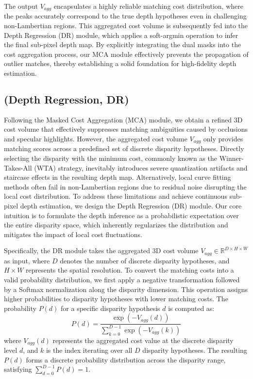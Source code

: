 \documentclass[lettersize,journal]{IEEEtran}
\begin{document}
The output $V_{agg}$ encapsulates a highly reliable matching cost distribution, where the peaks accurately correspond to the true depth hypotheses even in challenging non-Lambertian regions. This aggregated cost volume is subsequently fed into the Depth Regression (DR) module, which applies a soft-argmin operation to infer the final sub-pixel depth map. By explicitly integrating the dual masks into the cost aggregation process, our MCA module effectively prevents the propagation of outlier matches, thereby establishing a solid foundation for high-fidelity depth estimation.

\subsection{(Depth Regression, DR)}

Following the Masked Cost Aggregation (MCA) module, we obtain a refined 3D cost volume that effectively suppresses matching ambiguities caused by occlusions and specular highlights. However, the aggregated cost volume $V_{agg}$ only provides matching scores across a predefined set of discrete disparity hypotheses. Directly selecting the disparity with the minimum cost, commonly known as the Winner-Takes-All (WTA) strategy, inevitably introduces severe quantization artifacts and staircase effects in the resulting depth map. Alternatively, local curve fitting methods often fail in non-Lambertian regions due to residual noise disrupting the local cost distribution. To address these limitations and achieve continuous sub-pixel depth estimation, we design the Depth Regression (DR) module. Our core intuition is to formulate the depth inference as a probabilistic expectation over the entire disparity space, which inherently regularizes the distribution and mitigates the impact of local cost fluctuations.

Specifically, the DR module takes the aggregated 3D cost volume $V_{agg} \in \mathbb{R}^{D \times H \times W}$ as input, where $D$ denotes the number of discrete disparity hypotheses, and $H \times W$ represents the spatial resolution. To convert the matching costs into a valid probability distribution, we first apply a negative transformation followed by a Softmax normalization along the disparity dimension. This operation assigns higher probabilities to disparity hypotheses with lower matching costs. The probability $P(d)$ for a specific disparity hypothesis $d$ is computed as:
\begin{equation}
\label{eq:eq16}
P(d) = \frac{\exp(-V_{agg}(d))}{\sum_{k=0}^{D-1} \exp(-V_{agg}(k))}
\end{equation}
where $V_{agg}(d)$ represents the aggregated cost value at the discrete disparity level $d$, and $k$ is the index iterating over all $D$ disparity hypotheses. The resulting $P(d)$ forms a discrete probability distribution across the disparity range, satisfying $\sum_{d=0}^{D-1} P(d) = 1$.
\end{document}
